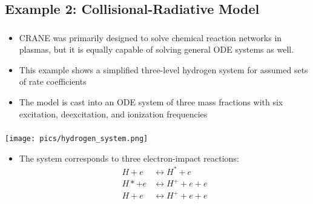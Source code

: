 \subsection{Example 2: Collisional-Radiative Model}
\begin{frame}[fragile]
	\frametitle{\insertsubsectionhead}
	\begin{itemize}
		\item CRANE was primarily designed to solve chemical reaction networks in plasmas, but it is equally capable of solving general ODE systems as well.
		\item This example shows a simplified three-level hydrogen system for assumed sets of rate coefficients \footnotemark
		\item The model is cast into an ODE system of three mass fractions with six excitation, deexcitation, and ionization frequencies
	\end{itemize}
\end{frame}

\begin{frame}[fragile]
	\frametitle{\insertsubsectionhead}
	\begin{center}
		\texttt{[image: pics/hydrogen\_system.png]}
	\end{center}
	\vspace{-1em}
	
	\begin{itemize}
		\item The system corresponds to three electron-impact reactions: 
		\begin{align*}
			H + e  &\leftrightarrow H^* + e \\
			H* + e  &\leftrightarrow H^+ + e + e \\
			H + e  &\leftrightarrow H^+ + e + e 
		\end{align*}
	\end{itemize}
\end{frame}

	
	
